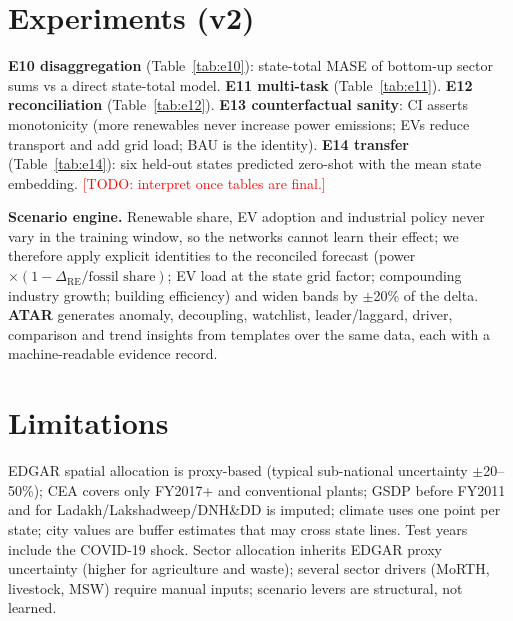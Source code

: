 \documentclass[conference]{IEEEtran}
\newcommand{\todo}[1]{\textcolor{red}{[TODO: #1]}}
\begin{document}
\section{Experiments (v2)}
\textbf{E10 disaggregation} (Table~\ref{tab:e10}): state-total MASE of bottom-up sector sums vs a direct state-total model.
\textbf{E11 multi-task} (Table~\ref{tab:e11}). \textbf{E12 reconciliation} (Table~\ref{tab:e12}).
\textbf{E13 counterfactual sanity}: CI asserts monotonicity (more renewables never increase power emissions; EVs reduce
transport and add grid load; BAU is the identity). \textbf{E14 transfer} (Table~\ref{tab:e14}): six held-out states predicted
zero-shot with the mean state embedding. \todo{interpret once tables are final.}
\begin{table}[t]\centering\caption{E10: state totals, bottom-up vs direct.}\label{tab:e10}\resizebox{\columnwidth}{!}{}\end{table}
\begin{table}[t]\centering\caption{E11: multi-task vs per-sector heads.}\label{tab:e11}\resizebox{\columnwidth}{!}{}\end{table}
\begin{table}[t]\centering\caption{E12: unreconciled vs two-level MinT.}\label{tab:e12}\resizebox{\columnwidth}{!}{}\end{table}
\begin{table}[t]\centering\caption{E14: zero-shot transfer to held-out states.}\label{tab:e14}\resizebox{\columnwidth}{!}{}\end{table}

\textbf{Scenario engine.} Renewable share, EV adoption and industrial policy never vary in the training window, so the
networks cannot learn their effect; we therefore apply explicit identities to the reconciled forecast (power $\times
(1-\Delta_{\text{RE}}/\text{fossil share})$; EV load at the state grid factor; compounding industry growth; building
efficiency) and widen bands by $\pm$20\% of the delta. \textbf{ATAR} generates anomaly, decoupling, watchlist,
leader/laggard, driver, comparison and trend insights from templates over the same data, each with a machine-readable
evidence record.

\section{Limitations}
EDGAR spatial allocation is proxy-based (typical sub-national uncertainty $\pm$20--50\%); CEA covers only FY2017+ and
conventional plants; GSDP before FY2011 and for Ladakh/Lakshadweep/DNH\&DD is imputed; climate uses one point per state;
city values are buffer estimates that may cross state lines. Test years include the COVID-19 shock. Sector allocation inherits EDGAR proxy uncertainty (higher for agriculture and waste); several sector drivers (MoRTH, livestock, MSW) require manual inputs; scenario levers are structural, not learned.
\end{document}
